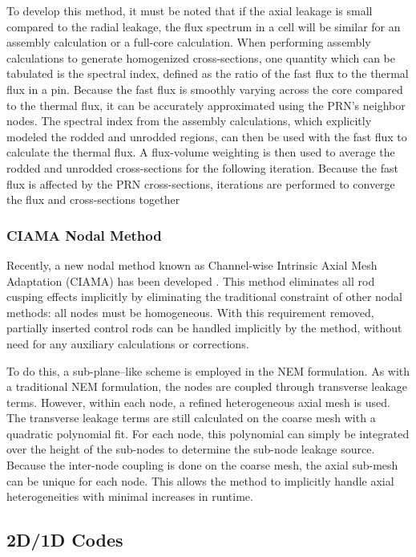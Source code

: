 To develop this method, it must be noted that if the axial leakage is small compared to the radial leakage, the flux spectrum in a cell will be similar for an assembly calculation or a full-core calculation.  When performing assembly calculations to generate homogenized cross-sections, one quantity which can be tabulated is the spectral index, defined as the ratio of the fast flux to the thermal flux in a pin.  Because the fast flux is smoothly varying across the core compared to the thermal flux, it can be accurately approximated using the PRN's neighbor nodes.  The spectral index from the assembly calculations, which explicitly modeled the rodded and unrodded regions, can then be used with the fast flux to calculate the thermal flux.  A flux-volume weighting is then used to average the rodded and unrodded cross-sections for the following iteration.  Because the fast flux is affected by the PRN cross-sections, iterations are performed to converge the flux and cross-sections together

\subsubsection{CIAMA Nodal Method}

Recently, a new nodal method known as Channel-wise Intrinsic Axial Mesh Adaptation (CIAMA) has been developed \cite{yu2015CIAMArodDecusping,lu2015CIAMAintro}.  This method eliminates all rod cusping effects implicitly by eliminating the traditional constraint of other nodal methods: all nodes must be homogeneous.  With this requirement removed, partially inserted control rods can be handled implicitly by the method, without need for any auxiliary calculations or corrections.

To do this, a sub-plane--like scheme is employed in the NEM formulation.  As with a traditional NEM formulation, the nodes are coupled through transverse leakage terms.  However, within each node, a refined heterogeneous axial mesh is used.  The transverse leakage terms are still calculated on the coarse mesh with a quadratic polynomial fit.  For each node, this polynomial can simply be integrated over the height of the sub-nodes to determine the sub-node leakage source.  Because the inter-node coupling is done on the coarse mesh, the axial sub-mesh can be unique for each node.  This allows the method to implicitly handle axial heterogeneities with minimal increases in runtime.

\subsection{2D/1D Codes}\label{ss:2d1d-old-decusping-methods}

